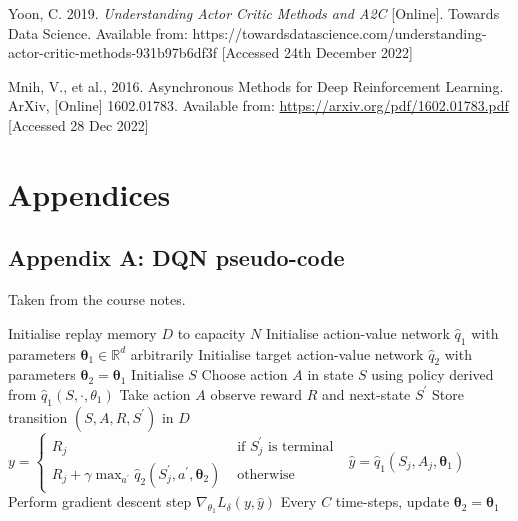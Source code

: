 \documentclass{article}
\begin{document}
Yoon, C. 2019. \emph{Understanding Actor Critic Methods and A2C} [Online]. Towards Data Science. Available from: https://towardsdatascience.com/understanding-actor-critic-methods-931b97b6df3f [Accessed 24th December 2022]


\small

Mnih, V., et al., 2016. Asynchronous Methods for Deep Reinforcement Learning. ArXiv, [Online] 1602.01783.
Available from: \url{https://arxiv.org/pdf/1602.01783.pdf} [Accessed 28 Dec 2022]

\normalsize
\newpage
\section*{Appendices}
\subsection*{Appendix A: DQN pseudo-code}
\label{dqn_pseudo}
Taken from the course notes.
\begin{algorithmic}[1]
\State Initialise replay memory $D$ to capacity $N$
\State Initialise action-value network $\hat{q}_{1}$ with parameters $\boldsymbol{\theta}_{1} \in \mathbb{R}^{d}$ arbitrarily
\State Initialise target action-value network $\hat{q}_{2}$ with parameters $\boldsymbol{\theta}_{2}=\boldsymbol{\theta}_{1}$
    \State $\text{Initialise } S$
        \State Choose action $A$ in state $S$ using policy derived from  $\hat{q}_{1}\left(S, \cdot, \theta_{1}\right)$
        \State Take action $A$ observe reward $R$ and next-state $S^{\prime}$
        \State Store transition $\left(S, A, R, S^{\prime}\right)$ in $D$
            \State $y= \begin{cases}R_{j} & \text { if } S_{j}^{\prime} \text { is terminal } \\ R_{j}+\gamma \max _{a^{\prime}} \hat{q}_{2}\left(S_{j}^{\prime}, a^{\prime}, \boldsymbol{\theta}_{2}\right) & \text { otherwise }\end{cases}$
            \State $\hat{y}=\hat{q}_{1}\left(S_{j}, A_{j}, \boldsymbol{\theta}_{1}\right)$
            \State Perform gradient descent step $\nabla_{\theta_{1}} L_{\delta}(y, \hat{y})$
        \EndFor
    \State Every $C$ time-steps, update $\boldsymbol{\theta}_{2}=\boldsymbol{\theta}_{1}$
    \EndFor
\EndFor
\end{algorithmic}
\end{document}
